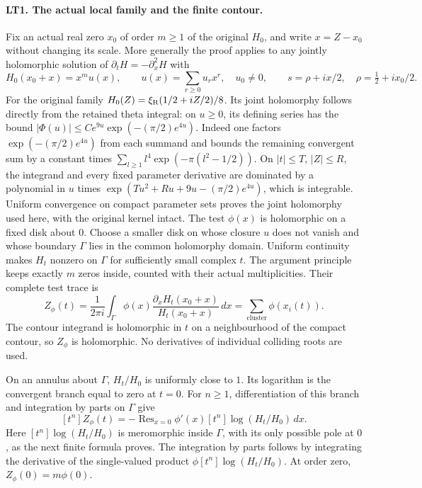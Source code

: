 \paragraph{LT1. The actual local family and the finite contour.}
Fix an actual real zero $x_0$ of order $m\ge1$ of the original
$H_0$, and write $x=Z-x_0$ without changing its scale. More generally
the proof applies to any jointly holomorphic solution of
$\partial_tH=-\partial_x^2H$ with
\[
 H_0(x_0+x)=x^mu(x),\qquad
 u(x)=\sum_{r\ge0}u_rx^r,\quad u_0\ne0,\qquad
 s=\rho+ix/2,\quad \rho=\tfrac12+ix_0/2.
 \tag{LT1}
\]
For the original family $H_0(Z)=\xi_{\rm R}(1/2+iZ/2)/8$.
Its joint holomorphy follows directly from the retained theta
integral: on $u\ge0$, its defining series has the bound
$|\Phi(u)|\le C e^{9u}\exp(-(\pi/2)e^{4u})$.
Indeed one factors $\exp(-(\pi/2)e^{4u})$ from each summand
and bounds the remaining convergent sum by a constant times
$\sum_{l\ge1}l^4\exp(-\pi(l^2-1/2))$.
On $|t|\le T$, $|Z|\le R$, the integrand and every fixed
parameter derivative are dominated by a polynomial in $u$
times $\exp(Tu^2+Ru+9u-(\pi/2)e^{4u})$, which is integrable.
Uniform convergence on compact parameter sets proves the
joint holomorphy used here, with the original kernel intact.
The test $\phi(x)$ is holomorphic on a fixed disk about $0$.
Choose a smaller disk on whose closure $u$ does not vanish and
whose boundary $\Gamma$ lies in the common holomorphy domain.
Uniform continuity makes $H_t$ nonzero on $\Gamma$ for sufficiently
small complex $t$. The argument principle keeps exactly $m$ zeros
inside, counted with their actual multiplicities. Their complete
test trace is
\[
 Z_\phi(t)=\frac1{2\pi i}\int_\Gamma
       \phi(x)\frac{\partial_xH_t(x_0+x)}{H_t(x_0+x)}\,dx
       =\sum_{\text{cluster}}\phi(x_i(t)).
 \tag{LT2}
\]
The contour integrand is holomorphic in $t$ on a neighbourhood
of the compact contour, so $Z_\phi$ is holomorphic. No derivatives
of individual colliding roots are used.

On an annulus about $\Gamma$, $H_t/H_0$ is uniformly close to $1$.
Its logarithm is the convergent branch equal to zero at $t=0$.
For $n\ge1$, differentiation of this branch and integration by
parts on $\Gamma$ give
\[
 \boxed{[t^n]Z_\phi(t)
   =-\operatorname{Res}_{x=0}
       \phi'(x)[t^n]\log(H_t/H_0)\,dx.}
 \tag{LT3}
\]
Here $[t^n]\log(H_t/H_0)$ is meromorphic inside $\Gamma$, with
its only possible pole at $0$, as the next finite formula proves.
The integration by parts follows by integrating the derivative
of the single-valued product $\phi[t^n]\log(H_t/H_0)$.
At order zero, $Z_\phi(0)=m\phi(0)$.

